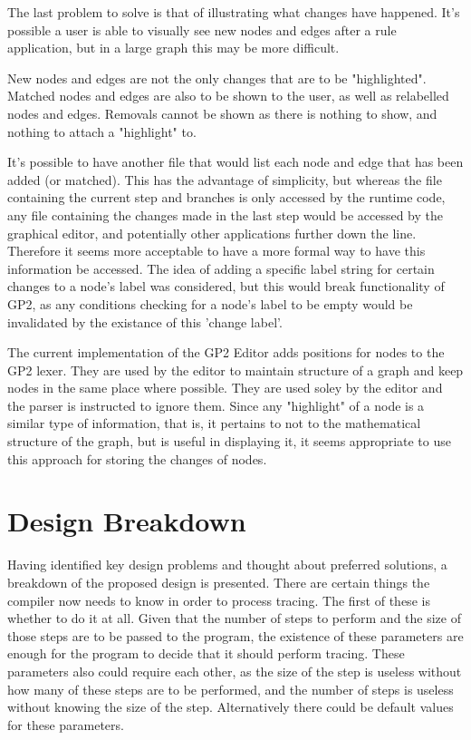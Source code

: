 \documentclass{UoYCSproject}
\begin{document}
The last problem to solve is that of illustrating what changes have happened. It's possible a user is able to visually see new nodes and edges after a rule application, but in a large graph this may be more difficult. 

New nodes and edges are not the only changes that are to be "highlighted". Matched nodes and edges are also to be shown to the user, as well as relabelled nodes and edges. Removals cannot be shown as there is nothing to show, and nothing to attach a "highlight" to.

It's possible to have another file that would list each node and edge that has been added (or matched). This has the advantage of simplicity, but whereas the file containing the current step and branches is only accessed by the runtime code, any file containing the changes made in the last step would be accessed by the graphical editor, and potentially other applications further down the line. Therefore it seems more acceptable to have a more formal way to have this information be accessed. The idea of adding a specific label string for certain changes to a node's label was considered, but this would break functionality of GP2, as any conditions checking for a node's label to be empty would be invalidated by the existance of this 'change label'.

The current implementation of the GP2 Editor adds positions for nodes to the GP2 lexer. They are used by the editor to maintain structure of a graph and keep nodes in the same place where possible. They are used soley by the editor and the parser is instructed to ignore them. Since any "highlight" of a node is a similar type of information, that is, it pertains to not to the mathematical structure of the graph, but is useful in displaying it, it seems appropriate to use this approach for storing the changes of nodes.

\section{Design Breakdown}

Having identified key design problems and thought about preferred solutions, a breakdown of the proposed design is presented. There are certain things the compiler now needs to know in order to process tracing. The first of these is whether to do it at all. Given that the number of steps to perform and the size of those steps are to be passed to the program, the existence of these parameters are enough for the program to decide that it should perform tracing. These parameters also could require each other, as the size of the step is useless without how many of these steps are to be performed, and the number of steps is useless without knowing the size of the step. Alternatively there could be default values for these parameters. 
\end{document}
